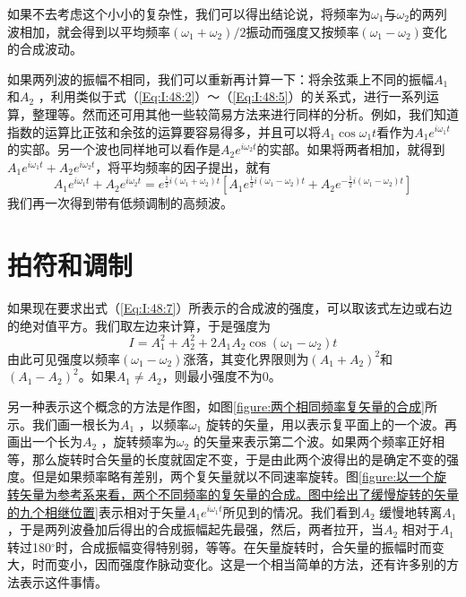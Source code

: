 如果不去考虑这个小小的复杂性，我们可以得出结论说，将频率为$\omega_1$与$\omega_2$的两列波相加，就会得到以平均频率$(\omega_1 +\omega_2)/2$振动而强度又按频率$(\omega_1 -\omega_2)$变化的合成波动。

如果两列波的振幅不相同，我们可以重新再计算一下：将余弦乘上不同的振幅$A_1$和$A_2$ ，利用类似于式（\ref{Eq:I:48:2}）～（\ref{Eq:I:48:5}）的关系式，进行一系列运算，整理等。然而还可用其他一些较简易方法来进行同样的分析。例如，我们知道指数的运算比正弦和余弦的运算要容易得多，并且可以将$A_1\cos\omega_1 t$看作为$A_1e^{i\omega_1 t}$的实部。另一个波也同样地可以看作是$A_2e^{i\omega_2 t}$的实部。如果将两者相加，就得到$A_1e^{i\omega_1 t}+A_2e^{i\omega_2 t}$，将平均频率的因子提出，就有
\begin{equation}
    \label{Eq:I:48:7}
    A_1e^{i\omega_1 t}+A_2e^{i\omega_2 t} = e^{\frac{1}{2}i(\omega_1+\omega_2)t}\left[A_1e^{\frac{1}{2}i(\omega_1-\omega_2)t}+A_2e^{-\frac{1}{2}i(\omega_1-\omega_2)t}\right]
\end{equation}
我们再一次得到带有低频调制的高频波。

\section{拍符和调制}

如果现在要求出式（\ref{Eq:I:48:7}）所表示的合成波的强度，可以取该式左边或右边的绝对值平方。我们取左边来计算，于是强度为
\begin{equation}
    \label{Eq:I:48:8}
    I=A_1^2 + A_2^2 + 2A_1A_2\cos(\omega_1-\omega_2)t
\end{equation}
由此可见强度以频率$(\omega_1 - \omega_2)$涨落，其变化界限则为$(A_1 +A_2)^2$和$(A_1 -A_2)^2$。如果$A_1 \neq A_2$，则最小强度不为0。

另一种表示这个概念的方法是作图，如图\ref{figure:两个相同频率复矢量的合成}所示。我们画一根长为$A_1$ ，以频率$\omega_1$ 旋转的矢量，用以表示复平面上的一个波。再画出一个长为$A_2$ ，旋转频率为$\omega_2$ 的矢量来表示第二个波。如果两个频率正好相等，那么旋转时合矢量的长度就固定不变，于是由此两个波得出的是确定不变的强度。但是如果频率略有差别，两个复矢量就以不同速率旋转。图\ref{figure:以一个旋转矢量为参考系来看，两个不同频率的复矢量的合成。图中绘出了缓慢旋转的矢量的九个相继位置}表示相对于矢量$A_1e^{i\omega_1t}$所见到的情况。我们看到$A_2$ 缓慢地转离$A_1$ ，于是两列波叠加后得出的合成振幅起先最强，然后，两者拉开，当$A_2$ 相对于$A_1$ 转过180$^\circ$时，合成振幅变得特别弱，等等。在矢量旋转时，合矢量的振幅时而变大，时而变小，因而强度作脉动变化。这是一个相当简单的方法，还有许多别的方法表示这件事情。

